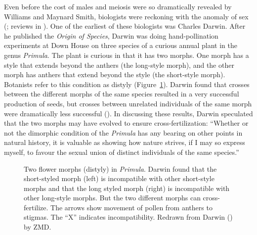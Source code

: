 \documentclass[
  letterpaper,
]{book}
\begin{document}
Even before the cost of males and meiosis were so dramatically revealed
by Williams and Maynard Smith, biologists were reckoning with the
anomaly of sex (; reviews in
). One of the earliest of
these biologists was Charles Darwin. After he published the \emph{Origin
of Species}, Darwin was doing hand-pollination experiments at Down House
on three species of a curious annual plant in the genus \emph{Primula}.
The plant is curious in that it has two morphs. One morph has a style
that extends beyond the anthers (the long-style morph), and the other
morph has anthers that extend beyond the style (the short-style morph).
Botanists refer to this condition as distyly (Figure~\ref{fig-1.3}).
Darwin found that crosses between the different morphs of the same
species resulted in a very successful production of seeds, but crosses
between unrelated individuals of the same morph were dramatically less
successful (). In discussing these
results, Darwin speculated that the two morphs may have evolved to
ensure cross-fertilization: ``Whether or not the dimorphic condition of
the \emph{Primula} has any bearing on other points in natural history,
it is valuable as showing how nature strives, if I may so express
myself, to favour the sexual union of distinct individuals of the same
species.''

\begin{figure}


\caption[Two flower morphs (distyly) in
\emph{Primula}]{\label{fig-1.3}Two flower morphs (distyly) in
\emph{Primula}. Darwin found that the short-styled morph (left) is
incompatible with other short-style morphs and that the long styled
morph (right) is incompatible with other long-style morphs. But the two
different morphs can cross-fertilize. The arrows show movement of pollen
from anthers to stigmas. The ``X'' indicates incompatibility. Redrawn
from Darwin () by ZMD.}

\end{figure}%
\end{document}
